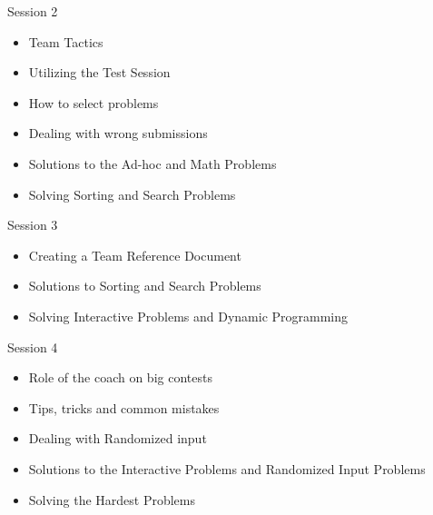 \documentclass[11pt,pdf, aspectratio=169]{beamer}
\begin{document}
  \begin{frame}{Session 2}
    \begin{itemize}
      \item Team Tactics
      \item Utilizing the Test Session
      \item How to select problems
      \item Dealing with wrong submissions
      \item Solutions to the Ad-hoc and Math Problems
      \item Solving Sorting and Search Problems
    \end{itemize}
  \end{frame}
  \begin{frame}{Session 3}
    \begin{itemize}
      \item Creating a Team Reference Document
      \item Solutions to Sorting and Search Problems
      \item Solving Interactive Problems and Dynamic Programming
    \end{itemize}
  \end{frame}
  \begin{frame}{Session 4}
    \begin{itemize}
      \item Role of the coach on big contests
      \item Tips, tricks and common mistakes
      \item Dealing with Randomized input
      \item Solutions to the Interactive Problems and Randomized Input Problems
      \item Solving the Hardest Problems
    \end{itemize}
  \end{frame}
\end{document}
